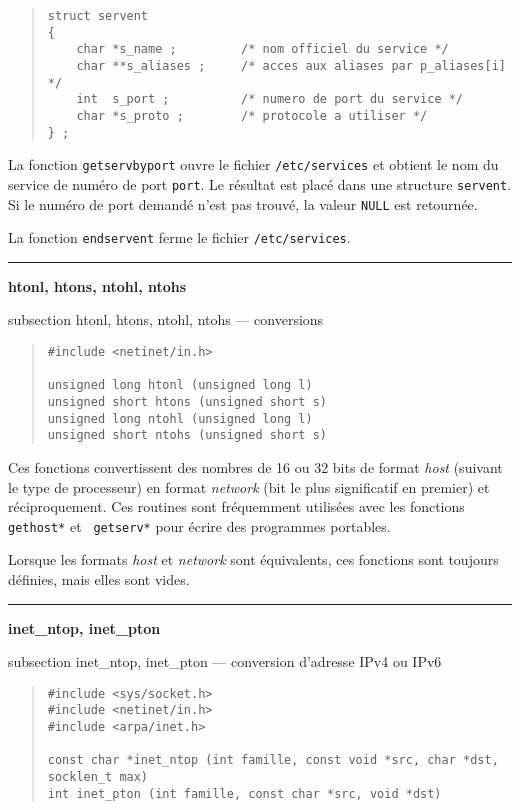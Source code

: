 \documentclass [twoside] {report}
\newcommand {\primitive} [1]
    {
	{\large \bf #1}
	\addcontentsline {toc} {subsection} {#1}
    }
\newcommand {\separation}
    {
	\vspace {7mm}
	\nopagebreak
	\hrule
    }
\begin{document}
\begin {quote}
    \small
\begin {verbatim}
struct servent
{
    char *s_name ;         /* nom officiel du service */
    char **s_aliases ;     /* acces aux aliases par p_aliases[i] */
    int  s_port ;          /* numero de port du service */
    char *s_proto ;        /* protocole a utiliser */
} ;
\end{verbatim}
\end {quote}

La fonction {\tt getservbyport} ouvre le fichier {\tt /etc/services} et
obtient le nom du service de numéro de port {\tt port}.  Le résultat est
placé dans une structure {\tt servent}.  Si le numéro de port demandé
n'est pas trouvé, la valeur {\tt NULL} est retournée.

La fonction {\tt endservent} ferme le fichier {\tt /etc/services}.


\separation
\primitive {htonl, htons, ntohl, ntohs} --- conversions

\begin {quote}
\begin {verbatim}
#include <netinet/in.h>

unsigned long htonl (unsigned long l)
unsigned short htons (unsigned short s)
unsigned long ntohl (unsigned long l)
unsigned short ntohs (unsigned short s)
\end{verbatim}
\end {quote}

Ces fonctions convertissent des nombres de 16 ou 32 bits de format {\em
host} (suivant le type de processeur) en format {\em network} (bit le
plus significatif en premier) et réciproquement.  Ces routines sont
fréquemment utilisées avec les fonctions {\tt gethost*} et {\tt
getserv*} pour écrire des programmes portables.

Lorsque les formats {\em host} et {\em network} sont équivalents, ces
fonctions sont toujours définies, mais elles sont vides.


\separation
\primitive {inet\_ntop, inet\_pton} --- conversion d'adresse IPv4 ou IPv6

\begin {quote}
\begin {verbatim}
#include <sys/socket.h>
#include <netinet/in.h>
#include <arpa/inet.h>

const char *inet_ntop (int famille, const void *src, char *dst, socklen_t max)
int inet_pton (int famille, const char *src, void *dst)
\end{verbatim}
\end {quote}
\end{document}
